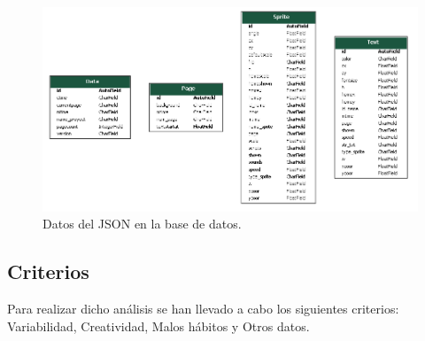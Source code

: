 \documentclass[a4paper, 12pt]{book}
\begin{document}
\begin{figure}[H]
  \centering
  \includegraphics[width=16cm, keepaspectratio]{img/bd_json.png}
  \caption{Datos del JSON en la base de datos.}\label{fig:bd_json}
\end{figure}

\newpage
\subsection{Criterios}
\label{subsec:Criterios}

\vspace{5mm}
Para realizar dicho análisis se han llevado a cabo los siguientes criterios: Variabilidad, Creatividad, Malos hábitos y Otros datos.
\end{document}
